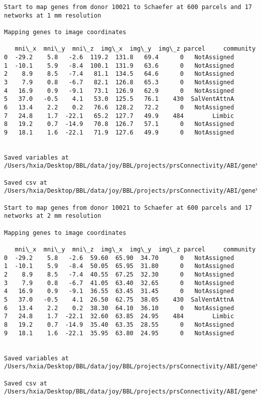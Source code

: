 \documentclass[11pt]{article}
\begin{document}
\begin{Verbatim}[commandchars=\\\{\}]
Start to map genes from donor 10021 to Schaefer at 600 parcels and 17 networks at 1 mm resolution

Mapping genes to image coordinates

   mni\_x  mni\_y  mni\_z  img\_x  img\_y  img\_z parcel     community
0  -29.2    5.8   -2.6  119.2  131.8   69.4      0   NotAssigned
1  -10.1    5.9   -8.4  100.1  131.9   63.6      0   NotAssigned
2    8.9    8.5   -7.4   81.1  134.5   64.6      0   NotAssigned
3    7.9    0.8   -6.7   82.1  126.8   65.3      0   NotAssigned
4   16.9    0.9   -9.1   73.1  126.9   62.9      0   NotAssigned
5   37.0   -0.5    4.1   53.0  125.5   76.1    430  SalVentAttnA
6   13.4    2.2    0.2   76.6  128.2   72.2      0   NotAssigned
7   24.8    1.7  -22.1   65.2  127.7   49.9    484        Limbic
8   19.2    0.7  -14.9   70.8  126.7   57.1      0   NotAssigned
9   18.1    1.6  -22.1   71.9  127.6   49.9      0   NotAssigned


Saved variables at /Users/hxia/Desktop/BBL/data/joy/BBL/projects/prsConnectivity/ABI/gene\_mapping/10021donor\_600Parcels\_17Network\_1mm.pkl

Saved csv at /Users/hxia/Desktop/BBL/data/joy/BBL/projects/prsConnectivity/ABI/gene\_mapping/10021donor\_600Parcels\_17Network\_1mm.csv

Start to map genes from donor 10021 to Schaefer at 600 parcels and 17 networks at 2 mm resolution

Mapping genes to image coordinates

   mni\_x  mni\_y  mni\_z  img\_x  img\_y  img\_z parcel     community
0  -29.2    5.8   -2.6  59.60  65.90  34.70      0   NotAssigned
1  -10.1    5.9   -8.4  50.05  65.95  31.80      0   NotAssigned
2    8.9    8.5   -7.4  40.55  67.25  32.30      0   NotAssigned
3    7.9    0.8   -6.7  41.05  63.40  32.65      0   NotAssigned
4   16.9    0.9   -9.1  36.55  63.45  31.45      0   NotAssigned
5   37.0   -0.5    4.1  26.50  62.75  38.05    430  SalVentAttnA
6   13.4    2.2    0.2  38.30  64.10  36.10      0   NotAssigned
7   24.8    1.7  -22.1  32.60  63.85  24.95    484        Limbic
8   19.2    0.7  -14.9  35.40  63.35  28.55      0   NotAssigned
9   18.1    1.6  -22.1  35.95  63.80  24.95      0   NotAssigned


Saved variables at /Users/hxia/Desktop/BBL/data/joy/BBL/projects/prsConnectivity/ABI/gene\_mapping/10021donor\_600Parcels\_17Network\_2mm.pkl

Saved csv at /Users/hxia/Desktop/BBL/data/joy/BBL/projects/prsConnectivity/ABI/gene\_mapping/10021donor\_600Parcels\_17Network\_2mm.csv


\end{Verbatim}
\end{document}
